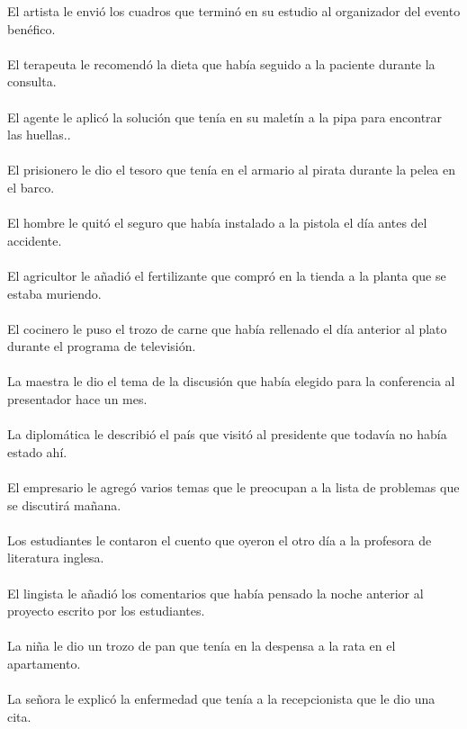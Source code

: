 El artista le envi\'{o} los cuadros que termin\'{o} en su estudio al organizador del evento benéfico.	\\	\\
El terapeuta le recomend\'{o} la dieta que hab\'{i}a seguido a la paciente durante la consulta.	\\	\\
El agente le aplic\'{o} la soluci\'{o}n que ten\'{i}a en su malet\'{i}n a la pipa para encontrar las huellas..	\\	\\
El prisionero le dio el tesoro que ten\'{i}a en el armario al pirata durante la pelea en el barco.	\\	\\
El hombre le quit\'{o} el seguro que hab\'{i}a instalado a la pistola el d\'{i}a antes del accidente.	\\	\\
El agricultor le a\~{n}adi\'{o} el fertilizante que compr\'{o} en la tienda a la planta que se estaba muriendo.	\\	\\
El cocinero le puso el trozo de carne que hab\'{i}a rellenado el d\'{i}a anterior al plato durante el programa de televisi\'{o}n.	\\	\\
La maestra le dio el tema de la discusi\'{o}n que hab\'{i}a elegido para la conferencia al presentador hace un mes.	\\	\\
La diplom\'{a}tica le describi\'{o} el pa\'{i}s que visit\'{o} al presidente que todav\'{i}a no hab\'{i}a estado ah\'{i}.	\\	\\
El empresario le agreg\'{o} varios temas que le preocupan a la lista de problemas que se discutir\'{a} ma\~{n}ana.	\\	\\
Los estudiantes le contaron el cuento que oyeron el otro d\'{i}a a la profesora de literatura inglesa.	\\	\\
El lingista le a\~{n}adi\'{o} los comentarios que hab\'{i}a pensado la noche anterior al proyecto escrito por los estudiantes.	\\	\\
La ni\~{n}a le dio un trozo de pan que ten\'{i}a en la despensa a la rata en el apartamento.	\\	\\
La se\~{n}ora le explic\'{o} la enfermedad que ten\'{i}a a la recepcionista que le dio una cita.	\\	\\
